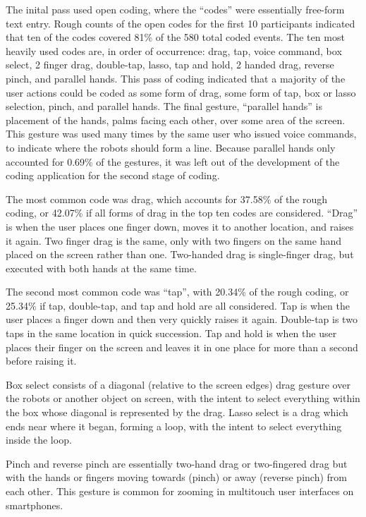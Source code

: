 The inital pass used open coding, where the ``codes'' were essentially free-form text entry. 
Rough counts of the open codes for the first 10 participants indicated that ten of the codes covered 81\% of the 580 total coded events. 
The ten most heavily used codes are, in order of occurrence: drag, tap, voice command, box select, 2 finger drag, double-tap, lasso, tap and hold, 2 handed drag, reverse pinch, and parallel hands. 
This pass of coding indicated that a majority of the user actions could be coded as some form of drag, some form of tap, box or lasso selection, pinch, and parallel hands. 
The final gesture, ``parallel hands'' is placement of the hands, palms facing each other, over some area of the screen. This gesture was used many times by the same user who issued voice commands, to indicate where the robots should form a line. Because parallel hands only accounted for 0.69\% of the gestures, it was left out of the development of the coding application for the second stage of coding. 

The most common code was drag, which accounts for 37.58\% of the rough coding, or 42.07\% if all forms of drag in the top ten codes are considered. ``Drag'' is when the user places one finger down, moves it to another location, and raises it again. Two finger drag is the same, only with two fingers on the same hand placed on the screen rather than one. Two-handed drag is single-finger drag, but executed with both hands at the same time. 

The second most common code was ``tap'', with 20.34\% of the rough coding, or 25.34\% if tap, double-tap, and tap and hold are all considered. Tap is when the user places a finger down and then very quickly raises it again. Double-tap is two taps in the same location in quick succession. Tap and hold is when the user places their finger on the screen and leaves it in one place for more than a second before raising it. 

Box select consists of a diagonal (relative to the screen edges) drag gesture over the robots or another object on screen, with the intent to select everything within the box whose diagonal is represented by the drag. 
Lasso select is a drag which ends near where it began, forming a loop, with the intent to select everything inside the loop. 

Pinch and reverse pinch are essentially two-hand drag or two-fingered drag but with the hands or fingers moving towards (pinch) or away (reverse pinch) from each other.
This gesture is common for zooming in multitouch user interfaces on smartphones. 

